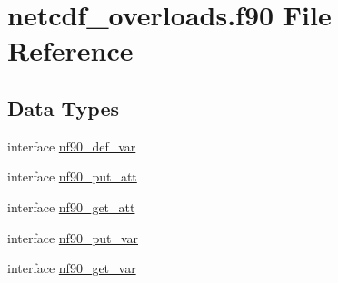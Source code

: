 \hypertarget{netcdf__overloads_8f90}{}\section{netcdf\+\_\+overloads.\+f90 File Reference}
\label{netcdf__overloads_8f90}
\subsection*{Data Types}
\begin{DoxyCompactItemize}
\item 
interface \hyperlink{interfacenf90__def__var}{nf90\+\_\+def\+\_\+var}
\item 
interface \hyperlink{interfacenf90__put__att}{nf90\+\_\+put\+\_\+att}
\item 
interface \hyperlink{interfacenf90__get__att}{nf90\+\_\+get\+\_\+att}
\item 
interface \hyperlink{interfacenf90__put__var}{nf90\+\_\+put\+\_\+var}
\item 
interface \hyperlink{interfacenf90__get__var}{nf90\+\_\+get\+\_\+var}
\end{DoxyCompactItemize}
